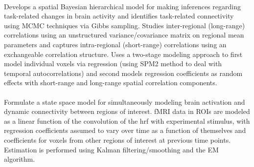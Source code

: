 \documentclass{article}
\begin{document}
 \\
\noindent Develops a spatial Bayesian hierarchical model for making inferences regarding task-related changes in brain activity and identifies task-related connectivity using MCMC techniques via Gibbs sampling. Studies inter-regional (long-range) correlations using an unstructured variance/covariance matrix on regional mean parameters and captures intra-regional (short-range) correlations using an exchangeable correlation structure. Uses a two-stage modeling approach to first model individual voxels via regression (using SPM2 method to deal with temporal autocorrelations) and second models regression coefficients as random effects with short-range and long-range spatial correlation components. \\

 \\
\noindent Formulate a state space model for simultaneously modeling brain activation and dynamic connectivity between regions of interest. fMRI data in ROIs are modeled as a linear function of the convolution of the hrf with experimental stimulus, with regression coefficients assumed to vary over time as a function of themselves and coefficients for voxels from other regions of interest at previous time points. Estimation is performed using Kalman filtering/smoothing and the EM algorithm.

\clearpage



\end{document}
